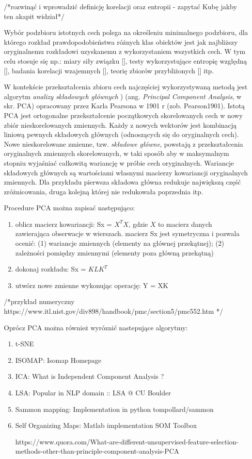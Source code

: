 /*rozwinąć i wprowadzić definicję korelacji oraz entropii - zapytać Kubę jakby ten akapit widział*/

Wybór podzbioru istotnych cech polega na określeniu minimalnego podzbioru, dla którego rozkład prawdopodobieństwa różnych klas obiektów jest jak najbliższy oryginalnemu rozkładowi uzyskanemu z wykorzystaniem wszystkich cech. W tym celu stosuje się np.: miary siły związku [], testy wykorzystujące entropię względną [], badania korelacji wzajemnych [], teorię zbiorów przybliżonych [] itp.

W kontekście przekształcenia zbioru cech najczęściej wykorzystywaną metodą jest algorytm \textit{analizy składowych głównych} ) (ang. \textit{Principal Component Analysis}, w skr. PCA) opracowany przez Karla Pearsona w 1901 r (zob. Pearson1901).  
Istotą PCA jest ortogonalne przekształcenie początkowych skorelowanych cech w nowy zbiór nieskorelowanych zmiennych. Każdy z nowych wektorów jest kombinacją liniową pewnych
składowych głównych (odnoszących się do oryginalnych cech). Nowe nieskorelowane zmienne, tzw. \textit{składowe główne}, powstają z przekształcenia oryginalnych zmiennych skorelowanych, w taki sposób aby w maksymalnym stopniu wyjaśniać całkowitą wariancję w próbie cech oryginalnych. Wariancje składowych głównych są wartościami własnymi macierzy kowariancji oryginalnych zmiennych. Dla przykładu pierwsza składowa główna redukuje największą część zróżnicowania, druga kolejną której nie redukowała poprzednia itp.

Procedure PCA można zapisać następująco:
\begin{enumerate}
\item oblicz macierz kowariancji: Sx = $X^{T}X$, gdzie $X$ to macierz danych zawierająca obserwacje w wierszach. macierz Sx jest symetryczna i pozwala ocenić: (1) wariancje zmiennych (elementy na głównej przekątnej); (2) zależności pomiędzy zmiennymi (elementy poza główną przekątną) 
\item dokonaj rozkładu: Sx = $KLK^T$
\item utwórz nowe zmienne wykonując operację: Y = XK
\end{enumerate}
/*przykład numeryczny https://www.itl.nist.gov/div898/handbook/pmc/section5/pmc552.htm */

Oprócz PCA można również wyróznić nastepujące algorytmy: 
\begin{enumerate}
	\item t-SNE
	\item ISOMAP: Isomap Homepage 
	\item ICA: What is Independent Component Analysis ?
	\item LSA: Popular in NLP domain :: LSA @ CU Boulder
	\item Sammon mapping: Implementation in python tompollard/sammon
	\item Self Organizing Maps: Matlab implementation SOM Toolbox	
	
	https://www.quora.com/What-are-different-unsupervised-feature-selection-methods-other-than-principle-component-analysis-PCA
\end{enumerate}




